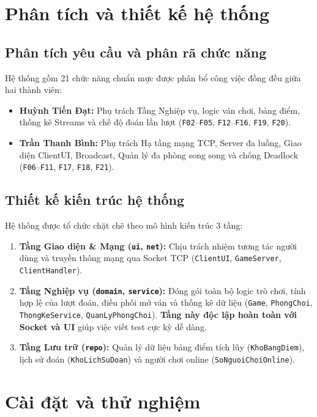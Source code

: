 \documentclass[12pt,a4paper,oneside]{report}
\begin{document}
\chapter{Phân tích và thiết kế hệ thống}

\section{Phân tích yêu cầu và phân rã chức năng}
Hệ thống gồm 21 chức năng chuẩn mực được phân bổ công việc đồng đều giữa hai thành viên:
\begin{itemize}
  \item \textbf{Huỳnh Tiến Đạt:} Phụ trách Tầng Nghiệp vụ, logic ván chơi, bảng điểm, thống kê Streams và chế độ đoán lần lượt (\texttt{F02}--\texttt{F05}, \texttt{F12}--\texttt{F16}, \texttt{F19}, \texttt{F20}).
  \item \textbf{Trần Thanh Bình:} Phụ trách Hạ tầng mạng TCP, Server đa luồng, Giao diện ClientUI, Broadcast, Quản lý đa phòng song song và chống Deadlock (\texttt{F06}--\texttt{F11}, \texttt{F17}, \texttt{F18}, \texttt{F21}).
\end{itemize}

\section{Thiết kế kiến trúc hệ thống}
Hệ thống được tổ chức chặt chẽ theo mô hình kiến trúc 3 tầng:
\begin{enumerate}
  \item \textbf{Tầng Giao diện \& Mạng (\texttt{ui}, \texttt{net}):} Chịu trách nhiệm tương tác người dùng và truyền thông mạng qua Socket TCP (\texttt{ClientUI}, \texttt{GameServer}, \texttt{ClientHandler}).
  \item \textbf{Tầng Nghiệp vụ (\texttt{domain}, \texttt{service}):} Đóng gói toàn bộ logic trò chơi, tính hợp lệ của lượt đoán, điều phối mở ván và thống kê dữ liệu (\texttt{Game}, \texttt{PhongChoi}, \texttt{ThongKeService}, \texttt{QuanLyPhongChoi}). \textbf{Tầng này độc lập hoàn toàn với Socket và UI} giúp việc viết test cực kỳ dễ dàng.
  \item \textbf{Tầng Lưu trữ (\texttt{repo}):} Quản lý dữ liệu bảng điểm tích lũy (\texttt{KhoBangDiem}), lịch sử đoán (\texttt{KhoLichSuDoan}) và người chơi online (\texttt{SoNguoiChoiOnline}).
\end{enumerate}

\chapter{Cài đặt và thử nghiệm}
\end{document}
